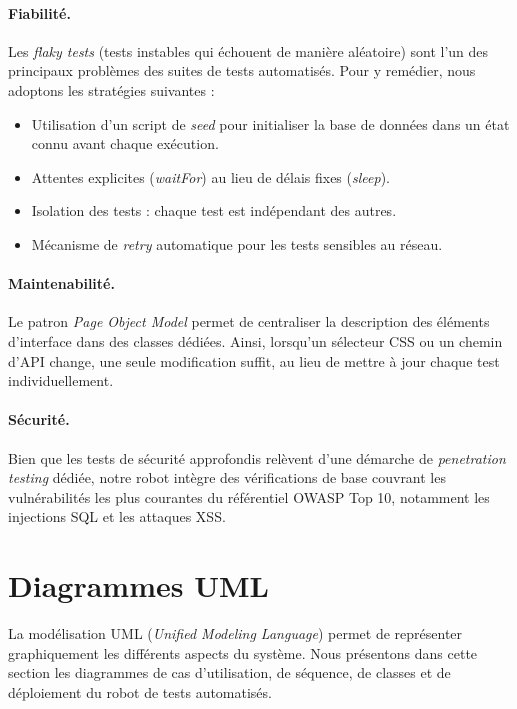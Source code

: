 \paragraph{Fiabilité.}
Les \textit{flaky tests} (tests instables qui échouent de manière aléatoire) sont l'un des principaux problèmes des suites de tests automatisés. Pour y remédier, nous adoptons les stratégies suivantes :
\begin{itemize}[nosep]
    \item Utilisation d'un script de \textit{seed} pour initialiser la base de données dans un état connu avant chaque exécution.
    \item Attentes explicites (\textit{waitFor}) au lieu de délais fixes (\textit{sleep}).
    \item Isolation des tests : chaque test est indépendant des autres.
    \item Mécanisme de \textit{retry} automatique pour les tests sensibles au réseau.
\end{itemize}

\paragraph{Maintenabilité.}
Le patron \textit{Page Object Model} permet de centraliser la description des éléments d'interface dans des classes dédiées. Ainsi, lorsqu'un sélecteur CSS ou un chemin d'API change, une seule modification suffit, au lieu de mettre à jour chaque test individuellement.

\paragraph{Sécurité.}
Bien que les tests de sécurité approfondis relèvent d'une démarche de \textit{penetration testing} dédiée, notre robot intègre des vérifications de base couvrant les vulnérabilités les plus courantes du référentiel OWASP Top 10, notamment les injections SQL et les attaques XSS.

\section{Diagrammes UML}
\label{sec:diagrammes-uml}

La modélisation UML (\textit{Unified Modeling Language}) permet de représenter graphiquement les différents aspects du système. Nous présentons dans cette section les diagrammes de cas d'utilisation, de séquence, de classes et de déploiement du robot de tests automatisés.

